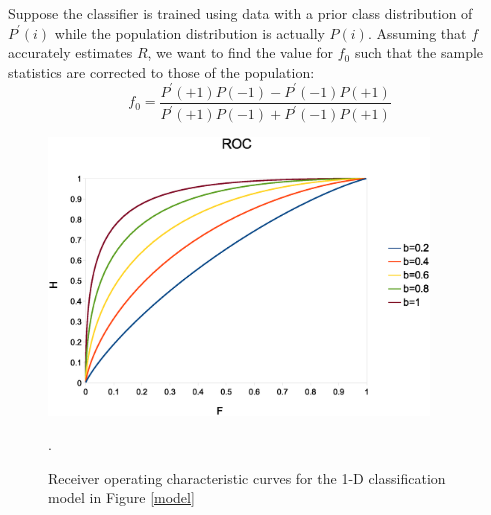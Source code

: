 \documentclass{article}
\begin{document}
Suppose the classifier is trained using data with a prior class distribution of
$P^\prime(i)$ while the population distribution is actually $P(i)$.
Assuming that $f$ accurately estimates $R$, 
we want to find the value for $f_0$ such that the sample statistics
are corrected to those of the population:
\begin{equation}
	f_0 = \frac{P^\prime(+1) P(-1) - P^\prime(-1) P(+1)}
	{P^\prime(+1) P(-1) + P^\prime(-1) P(+1)}
	\label{class_size_cal}
\end{equation}

\begin{figure}
	\includegraphics[width=0.9\textwidth]{roc}
	\caption{Receiver operating characteristic curves for the 1-D classification model in Figure \ref{model}}.
	\label{ROC}
\end{figure}
\end{document}
